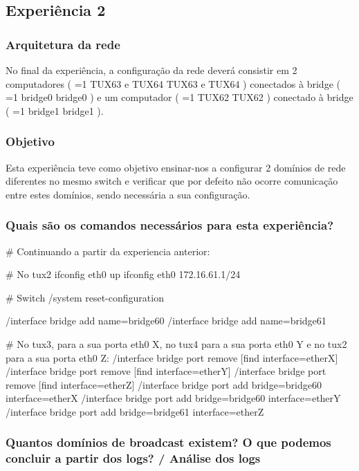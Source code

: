\documentclass[11pt,a4paper]{article}
\newcommand{\hl}[2][1]{%
  \ifnum#1=1\relax
    \textcolor{text-hl1}{#2}%
  \else
    \textcolor{text-hl2}{#2}%
  \fi
}
\begin{document}
\begin{multicols}{2}
\subsection{Experiência 2}

\subsubsection{Arquitetura da rede}

No final da experiência, a configuração da rede deverá consistir em 2 computadores (\hl[2]{TUX63 e TUX64}) conectados à bridge (\hl[2]{bridge0}) e um computador (\hl[2]{TUX62}) conectado à bridge (\hl[2]{bridge1}). 

\subsubsection{Objetivo}

Esta experiência teve como objetivo ensinar-nos a configurar 2 domínios de rede diferentes no mesmo switch e verificar que por defeito não ocorre comunicação entre estes domínios, sendo necessária a sua configuração.

\subsubsection{Quais são os comandos necessários para esta experiência?}

\begin{bash-darktheme}
    # Continuando a partir da experiencia anterior:

    # No tux2
    ifconfig eth0 up
    ifconfig eth0 172.16.61.1/24

    # Switch
    /system reset-configuration

    /interface bridge add name=bridge60
    /interface bridge add name=bridge61

    # No tux3, para a sua porta eth0 X, no tux4 para a sua porta eth0 Y e no tux2 para a sua porta eth0 Z:
    /interface bridge port remove [find interface=etherX]
    /interface bridge port remove [find interface=etherY]
    /interface bridge port remove [find interface=etherZ]
    /interface bridge port add bridge=bridge60 interface=etherX
    /interface bridge port add bridge=bridge60 interface=etherY
    /interface bridge port add bridge=bridge61 interface=etherZ
\end{bash-darktheme}

\subsubsection{ Quantos domínios de broadcast existem? O que podemos concluir a partir dos logs? / Análise dos logs}


\end{multicols}
\end{document}
